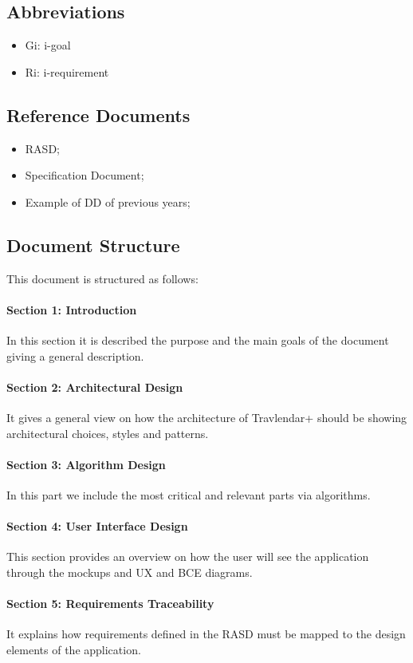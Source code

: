 \documentclass[12pt,titlepage]{article}
\begin{document}
\subsection{Abbreviations}
\begin{itemize}
\item	Gi: i-goal
\item	Ri: i-requirement
\end{itemize}

\subsection{Reference Documents}
\begin{itemize}
\item RASD;
\item Specification Document;
\item Example of DD of previous years;
\end{itemize}
\subsection{Document Structure}
This document is structured as follows:
\paragraph{Section 1: Introduction}
In this section it is described the purpose and the main goals  of the document giving a general description.
\paragraph{Section 2: Architectural Design}
It gives a general view on how the architecture of Travlendar+ should be showing architectural choices, styles and patterns.
\paragraph{Section 3: Algorithm Design}
In this part we include the most critical and relevant parts via algorithms.
\paragraph{Section 4: User Interface Design}
This section provides an overview on how the user will see the application through the mockups and UX and BCE diagrams.
\paragraph{Section 5: Requirements Traceability}
It explains how requirements defined in the RASD must be mapped to the design elements of the application.
\end{document}
